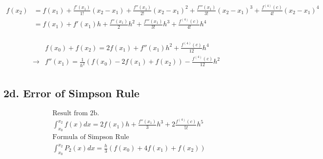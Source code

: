 \documentclass{article}
\begin{document}
\begin{equation}
  \begin{split}
    f(x_2) &= f(x_1) + \frac{f'(x_1)}{1!}(x_2-x_1) + \frac{f''(x_1)}{2!} (x_2-x_1)^2 + \frac{f'''(x_1)}{3!} (x_2-x_1)^3 + \frac{f^{(4)} (c)}{4!} (x_2-x_1)^4\\
    &= f(x_1) + f'(x_1) h + \frac{f''(x_1)}{2} h^2  + \frac{f'''(x_1)}{3!} h^3 + \frac{f^{(4)} (c)}{4!} h^4\\
  \end{split}
\end{equation}

\begin{equation}
  \begin{split}
    &f(x_0) + f(x_2) = 2 f(x_1) + f''(x_1) h^2  + \frac{f^{(4)} (c)}{12} h^4\\
    \rightarrow &f''(x_1)  = \frac{1}{h^2}(f(x_0) - 2 f(x_1) + f(x_2)) - \frac{f^{(4)} (c)}{12} h^2  \\
  \end{split}
\end{equation}


\subsection*{2d. Error of Simpson Rule }

\begin{equation}
  \begin{split}
    &\text{Result from 2b. }\\
    &\int^{x_2}_{x_0} f(x) dx  = 2 f(x_1) h + \frac{f''(x_1)}{3} h^3 + 2 \frac{f^{(4)} (c)}{5!} h^5 \\
    &\text{Formula of Simpson Rule }\\
    &\int^{x_2}_{x_0} P_2(x) dx = \frac{h}{3}(f(x_0)+4f(x_1)+f(x_2)) %
  \end{split}
\end{equation}
\end{document}
